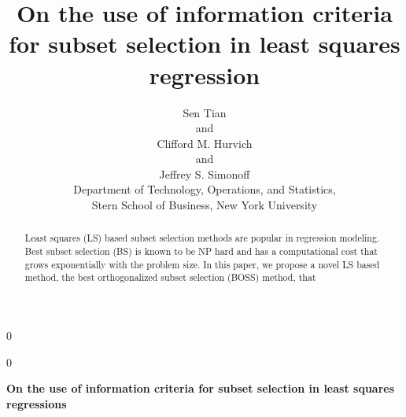 \documentclass[12pt]{article}
\newcommand{\blind}{0}
\begin{document}
%

\def\spacingset#1{\renewcommand{\baselinestretch}%
{#1}\small\normalsize} \spacingset{1}




\blind
{
  \title{\bf On the use of information criteria for subset selection in least squares regression}
  \author{Sen Tian\\
    and \\
    Clifford M. Hurvich \\
    and \\
    Jeffrey S. Simonoff \\
    Department of Technology, Operations, and Statistics, \\ Stern School of Business, New York University}
  \date{}
  \maketitle
} \fi

\blind
{
  \bigskip
  \bigskip
  \bigskip
  \begin{center}
    {\LARGE\bf On the use of information criteria for subset selection in least squares regressions}
\end{center}
  \medskip
} \fi

\begin{abstract}
  Least squares (LS) based subset selection methods are popular in regression modeling. Best subset selection (BS) is known to be NP hard and has a computational cost that grows exponentially with the problem size. In this paper, we propose a novel LS based method, the best orthogonalized subset selection (BOSS) method, that 

\end{abstract}
\end{document}
